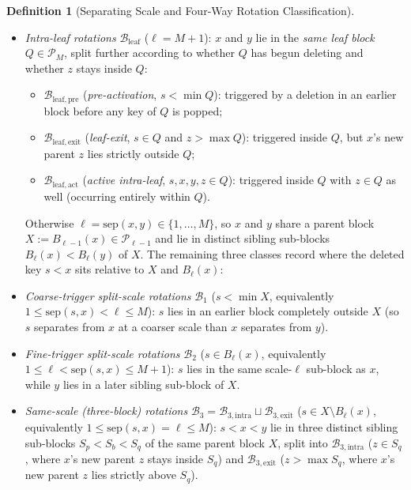 \documentclass[11pt]{article}
\theoremstyle{definition}
\newtheorem*{definition*}{Definition}
\theoremstyle{remark}
\newcommand{\sep}{\mathrm{sep}}
\begin{document}
\begin{definition*}[Separating Scale and Four-Way Rotation Classification]
\begin{enumerate}[label=(\arabic*), leftmargin=2em, itemsep=3pt]
  \begin{itemize}[leftmargin=1.6em, itemsep=2pt, topsep=2pt]
    \item \emph{Intra-leaf rotations} $\mathcal{B}_{\mathrm{leaf}}$ ($\ell = M + 1$): $x$ and $y$ lie in the \emph{same leaf block} $Q \in \mathcal{P}_M$, split further according to whether $Q$ has begun deleting and whether $z$ stays inside $Q$:
    \begin{itemize}[leftmargin=1.4em, itemsep=1pt, topsep=1pt]
      \item $\mathcal{B}_{\mathrm{leaf,pre}}$ (\emph{pre-activation}, $s < \min Q$): triggered by a deletion in an earlier block before any key of $Q$ is popped;
      \item $\mathcal{B}_{\mathrm{leaf,exit}}$ (\emph{leaf-exit}, $s \in Q$ and $z > \max Q$): triggered inside $Q$, but $x$'s new parent $z$ lies strictly outside $Q$;
      \item $\mathcal{B}_{\mathrm{leaf,act}}$ (\emph{active intra-leaf}, $s, x, y, z \in Q$): triggered inside $Q$ with $z \in Q$ as well (occurring entirely within $Q$).
    \end{itemize}
    Otherwise $\ell = \sep(x, y) \in \{1, \dots, M\}$, so $x$ and $y$ share a parent block $X := B_{\ell-1}(x) \in \mathcal{P}_{\ell-1}$ and lie in distinct sibling sub-blocks $B_\ell(x) < B_\ell(y)$ of $X$. The remaining three classes record where the deleted key $s < x$ sits relative to $X$ and $B_\ell(x)$:
    \item \emph{Coarse-trigger split-scale rotations} $\mathcal{B}_1$ ($s < \min X$, equivalently $1 \le \sep(s, x) < \ell \le M$): $s$ lies in an earlier block completely outside $X$ (so $s$ separates from $x$ at a coarser scale than $x$ separates from $y$).
    \item \emph{Fine-trigger split-scale rotations} $\mathcal{B}_2$ ($s \in B_\ell(x)$, equivalently $1 \le \ell < \sep(s, x) \le M + 1$): $s$ lies in the same scale-$\ell$ sub-block as $x$, while $y$ lies in a later sibling sub-block of $X$.
    \item \emph{Same-scale (three-block) rotations} $\mathcal{B}_3 = \mathcal{B}_{3,\mathrm{intra}} \sqcup \mathcal{B}_{3,\mathrm{exit}}$ ($s \in X \setminus B_\ell(x)$, equivalently $1 \le \sep(s, x) = \ell \le M$): $s < x < y$ lie in three distinct sibling sub-blocks $S_p < S_b < S_q$ of the same parent block $X$, split into $\mathcal{B}_{3,\mathrm{intra}}$ ($z \in S_q$, where $x$'s new parent $z$ stays inside $S_q$) and $\mathcal{B}_{3,\mathrm{exit}}$ ($z > \max S_q$, where $x$'s new parent $z$ lies strictly above $S_q$).
  \end{itemize}
\end{enumerate}
\end{definition*}
\end{document}
